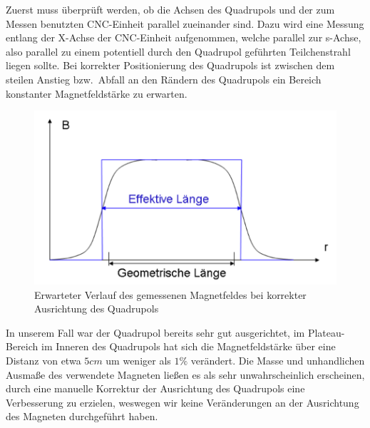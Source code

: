 \documentclass[bigchapter,colorback,accentcolor=tud4b,linedtoc,11pt]{tudreport}
\begin{document}
Zuerst muss überprüft werden, ob die Achsen des Quadrupols und der zum Messen benutzten CNC-Einheit parallel zueinander sind. Dazu wird eine Messung entlang der X-Achse der CNC-Einheit aufgenommen, welche parallel zur s-Achse, also parallel zu einem potentiell durch den Quadrupol geführten Teilchenstrahl liegen sollte. Bei korrekter Positionierung des Quadrupols ist zwischen dem steilen Anstieg bzw.\ Abfall an den Rändern des Quadrupols ein Bereich konstanter Magnetfeldstärke zu erwarten.
\begin{figure}[H]
\centering
\includegraphics[width=130mm]{img/magnetfeldplateau.png}
\caption{Erwarteter Verlauf des gemessenen Magnetfeldes bei korrekter Ausrichtung des Quadrupols \cite{anleitung}}
\end{figure}
In unserem Fall war der Quadrupol bereits sehr gut ausgerichtet, im Plateau-Bereich im Inneren des Quadrupols hat sich die Magnetfeldstärke über eine Distanz von etwa $5 cm$ um weniger als $1\%$ verändert. Die Masse und unhandlichen Ausmaße des verwendete Magneten ließen es als sehr unwahrscheinlich erscheinen, durch eine manuelle Korrektur der Ausrichtung des Quadrupols eine Verbesserung zu erzielen, weswegen wir keine Veränderungen an der Ausrichtung des Magneten durchgeführt haben.

\begin{center}
\begin{figure}[H]
\end{figure}
\end{center}
\end{document}
